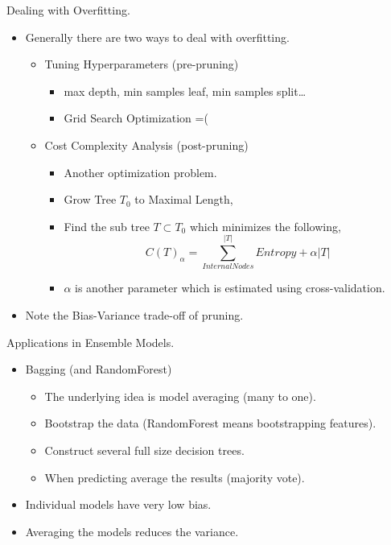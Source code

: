\documentclass[xcolor={svgnames},
               hyperref={colorlinks,citecolor=DeepPink4,linkcolor=FireBrick,urlcolor=Maroon}]
               {beamer}
\begin{document}
  \begin{frame}{Dealing with Overfitting.}
    \begin{itemize}
      \item Generally there are two ways to deal with overfitting.
        \begin{itemize}
          \item Tuning Hyperparameters (pre-pruning)
       
          \begin{itemize}
            \item max depth, min samples leaf, min samples split\dots
            \item Grid Search Optimization =(
          \end{itemize}
          \vfill
          
          \item Cost Complexity Analysis (post-pruning)
          \begin{itemize}
            \item Another optimization problem.
            \item Grow Tree $T_0$ to Maximal Length,
            \item Find the sub tree $T \subset T_0$ which minimizes the following, 
            \begin{equation*}
              C(T)_{\alpha} = \sum_{Internal Nodes}^{|T|} Entropy + \alpha|T|
            \end{equation*}
            \item $\alpha$ is another parameter which is estimated using cross-validation. 
          \end{itemize}
        \end{itemize}
      
        \item Note the Bias-Variance trade-off of pruning. 
    \end{itemize}
  \end{frame}



  \begin{frame}{Applications in Ensemble Models.}
    \begin{itemize}
      \item Bagging (and RandomForest)
        \begin{itemize}
          \item The underlying idea is model averaging (many to one).
          \item Bootstrap the data (RandomForest means bootstrapping features). 
          \item Construct several full size decision trees.
          \item When predicting average the results (majority vote).  
        \end{itemize}
        \vfill
      \item Individual models have very low bias.
      \item Averaging the models reduces the variance.
    \end{itemize}
  \end{frame}
\end{document}
